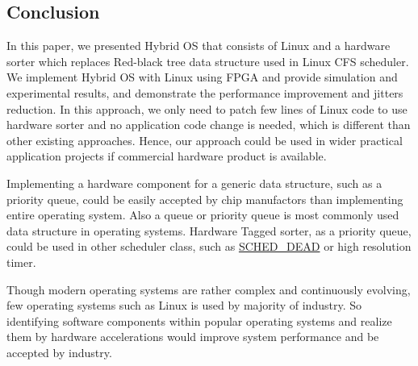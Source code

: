 \documentclass[10pt,a4paper]{article}
\begin{document}
\begin{multicols}{2}
\section{Conclusion}


In this paper, we presented Hybrid OS that consists of Linux and a hardware sorter which replaces Red-black tree data structure used in Linux CFS scheduler. We implement Hybrid OS with Linux using FPGA and provide simulation and experimental results, and demonstrate the performance improvement and jitters reduction. In this approach, we only need to patch few lines of Linux code to use hardware sorter and no application code change is needed, which is different than other existing approaches. Hence, our approach could be used in wider practical application projects if commercial hardware product is available.

Implementing a hardware component for a generic data structure, such as a priority queue, could be easily accepted by chip manufactors than implementing entire operating system. Also a queue or priority queue is most commonly used data structure in operating systems. Hardware Tagged sorter, as a priority queue, could be used in other scheduler class, such as \url{SCHED_DEAD} or high resolution timer.

Though modern operating systems are rather complex and continuously evolving, few operating systems such as Linux is used by majority of industry. So identifying software components within popular operating systems and realize them by hardware accelerations would improve system performance and be accepted by industry.

\begin{thebibliography}{9}%


\end{thebibliography}
\end{multicols}
\end{document}
